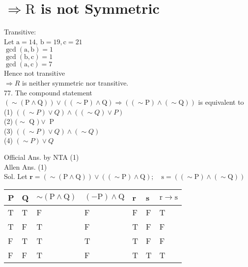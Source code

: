 \documentclass[10pt]{article}
\begin{document}
\section*{\(\Rightarrow \mathrm{R}\) is not Symmetric}
Transitive:\\
Let \(\mathrm{a}=14, \mathrm{~b}=19, \mathrm{c}=21\)\\
\(\operatorname{gcd}(\mathrm{a}, \mathrm{b})=1\)\\
\(\operatorname{gcd}(\mathrm{b}, \mathrm{c})=1\)\\
\(\operatorname{gcd}(\mathrm{a}, \mathrm{c})=7\)\\
Hence not transitive\\
\(\Rightarrow R\) is neither symmetric nor transitive.\\
77. The compound statement\\
\((\sim(\mathrm{P} \wedge \mathrm{Q})) \vee((\sim \mathrm{P}) \wedge \mathrm{Q}) \Rightarrow((\sim \mathrm{P}) \wedge(\sim \mathrm{Q}))\) is equivalent to\\
(1) \(((\sim P) \vee Q) \wedge((\sim Q) \vee P)\)\\
(2) \((\sim\) Q \() \vee\) P\\
(3) \(((\sim P) \vee Q) \wedge(\sim Q)\)\\
(4) \((\sim P) \vee Q\)

Official Ans. by NTA (1)\\
Allen Ans. (1)\\
Sol. Let \(\mathbf{r}=(\sim(\mathrm{P} \wedge \mathrm{Q})) \vee((\sim \mathrm{P}) \wedge \mathrm{Q}) ; \quad \mathrm{s}= ((\sim \mathrm{P}) \wedge(\sim \mathrm{Q}))\)

\begin{center}
\begin{tabular}{|l|l|l|l|l|l|l|}
\hline
P & Q & \(\sim(\mathrm{P} \wedge \mathrm{Q})\) & \((-\mathrm{P}) \wedge \mathrm{Q}\) & r & s & \(\mathrm{r} \rightarrow \mathrm{s}\) \\
\hline
T & T & F & F & F & F & T \\
\hline
T & F & T & F & T & F & F \\
\hline
F & T & T & T & T & F & F \\
\hline
F & F & T & F & T & T & T \\
\hline
\end{tabular}
\end{center}
\end{document}
